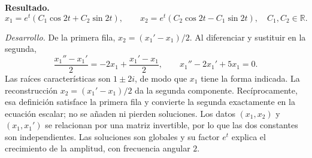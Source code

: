 \noindent\textbf{Resultado.} \[x_1=e^t(C_1\cos2t+C_2\sin2t),\qquad x_2=e^t(C_2\cos2t-C_1\sin2t),\quad C_1,C_2\in\mathbb R.\]

\noindent\textit{Desarrollo.} De la primera fila, $x_2=(x_1'-x_1)/2$. Al diferenciar y sustituir en la segunda,
\[\frac{x_1''-x_1'}2=-2x_1+\frac{x_1'-x_1}2,\qquad x_1''-2x_1'+5x_1=0.\]
Las raíces características son $1\pm2i$, de modo que $x_1$ tiene la forma indicada. La reconstrucción $x_2=(x_1'-x_1)/2$ da la segunda componente. Recíprocamente, esa definición satisface la primera fila y convierte la segunda exactamente en la ecuación escalar; no se añaden ni pierden soluciones. Los datos $(x_1,x_2)$ y $(x_1,x_1')$ se relacionan por una matriz invertible, por lo que las dos constantes son independientes. Las soluciones son globales y su factor $e^t$ explica el crecimiento de la amplitud, con frecuencia angular $2$.
